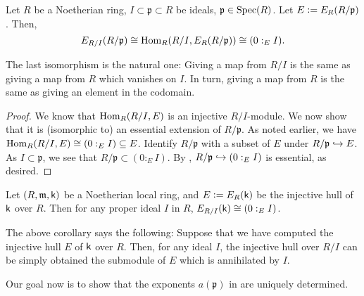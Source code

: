 \begin{thm} \label{thm:injective-hull-mod-p-over-mod-I}
	Let $R$ be a Noetherian ring, $I \subset \mathfrak{p} \subset R$ be ideals, $\mathfrak{p} \in \operatorname{Spec}(R)$. Let $E \vcentcolon= E_{R}(R/\mathfrak{p})$. Then,
	\begin{equation*} 
		E_{R/I}(R/\mathfrak{p}) \cong \operatorname{Hom}_{R}(R/I, E_{R}(R/\mathfrak{p})) \cong (0 :_{E} I).
	\end{equation*}
\end{thm}
The last isomorphism is the natural one: Giving a map from $R/I$ is the same as giving a map from $R$ which vanishes on $I$. In turn, giving a map from $R$ is the same as giving an element in the codomain.
\begin{proof} 
	We know that $\operatorname{Hom}_{R}(R/I, E)$ is an injective $R/I$-module. We now show that it is (isomorphic to) an essential extension of $R/\mathfrak{p}$. \newline
	As noted earlier, we have $\operatorname{Hom}_{R}(R/I, E) \cong (0 :_{E} I) \subseteq E$. Identify $R/\mathfrak{p}$ with a subset of $E$ under $R/\mathfrak{p} \hookrightarrow E$. As $I \subset \mathfrak{p}$, we see that $R/\mathfrak{p} \subset (0 :_{E} I)$. By , $R/\mathfrak{p} \hookrightarrow (0 :_{E} I)$ is essential, as desired.
\end{proof}

\begin{cor}
	Let $(R, \mathfrak{m}, \mathsf{k})$ be a Noetherian local ring, and $E \vcentcolon= E_{R}(\mathsf{k})$ be the injective hull of $\mathsf{k}$ over $R$. Then for any proper ideal $I$ in $R$, $E_{R/I}(\mathsf{k}) \cong (0 :_{E} I)$.
\end{cor}

\begin{rem}
	The above corollary says the following: Suppose that we have computed the injective hull $E$ of $\mathsf{k}$ over $R$. Then, for any ideal $I$, the injective hull over $R/I$ can be simply obtained the submodule of $E$ which is annihilated by $I$.
\end{rem}

Our goal now is to show that the exponents $a(\mathfrak{p})$ in  are uniquely determined. 

